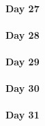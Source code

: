 \documentclass[UTF8,a4paper,8pt]{ctexart}
\begin{document}
 	 \paragraph{Day 27      \quad     }
 	 \paragraph{Day 28      \quad     }
 	 \paragraph{Day 29      \quad     }   
 	 \paragraph{Day 30      \quad     }
 	 \paragraph{Day 31      \quad     }
	
	
\end{document}
